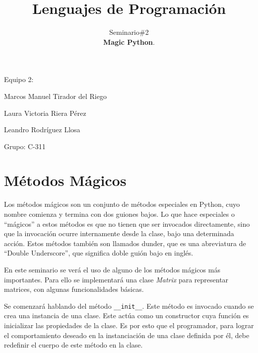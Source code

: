 \documentclass[10pt]{article}
\title{\textbf{Lenguajes de Programaci\'on}}
\author{Seminario\#2\\
 \textbf{Magic Python}.}
\date{}
\begin{document}
	\begin{titlepage}
		\clearpage	
		\maketitle
		\begin{center}
%			
			\vspace{5em}
			Equipo 2:
			
			Marcos Manuel Tirador del Riego
			
			Laura Victoria Riera P\'erez
			
			Leandro Rodr\'iguez Llosa
			\vspace{1em}
			
			Grupo: C-311
		\end{center}
		\thispagestyle{empty}
	\end{titlepage}


\newpage
{}
\tableofcontents
\thispagestyle{empty}

\newpage
{}

\section{M\'etodos M\'agicos}




Los m\'etodos m\'agicos son un conjunto de m\'etodos especiales en Python, cuyo nombre comienza y termina con dos guiones bajos. Lo que hace especiales o ``m\'agicos'' a estos m\'etodos es que no tienen que ser invocados directamente, sino que la invocaci\'on ocurre internamente desde la clase, bajo una determinada acci\'on. Estos m\'etodos tambi\'en son llamados dunder, que es una abreviatura de ``Double Underscore'', que significa doble gui\'on bajo en ingl\'es. 

En este seminario se ver\'a el uso de alguno de los m\'etodos m\'agicos m\'as importantes. Para ello se implementar\'a una clase \emph{Matrix} para representar matrices, con algunas funcionalidades b\'asicas.

Se comenzar\'a hablando del m\'etodo \texttt{\_\_init\_\_}. Este m\'etodo es invocado cuando se crea una instancia de una clase. Este act\'ua como un constructor cuya funci\'on es inicializar las propiedades de la clase. Es por esto que el programador, para lograr el comportamiento deseado en la instanciaci\'on de una clase definida por \'el, debe redefinir el cuerpo de este m\'etodo en la clase.
\end{document}
